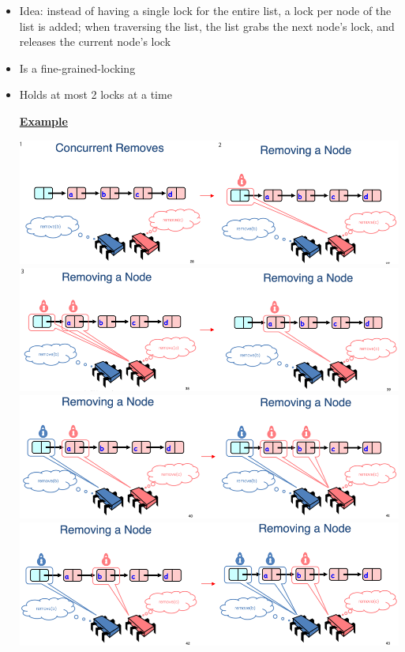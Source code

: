 \documentclass[12pt]{article}
\begin{document}
\begin{itemize}
    \item Idea: instead of having a single lock for the entire list, a lock per node
    of the list is added; when traversing the list, the list grabs the next node's lock,
    and releases the current node's lock
    \item Is a fine-grained-locking
    \item Holds at most 2 locks at a time

    \bigskip

    \underline{\textbf{Example}}

    \bigskip

    \begin{center}
    \includegraphics[width=\linewidth]{../images/midterm_3_solution_3.png}
    \includegraphics[width=\linewidth]{../images/midterm_3_solution_4.png}
    \includegraphics[width=\linewidth]{../images/midterm_3_solution_5.png}
    \includegraphics[width=\linewidth]{../images/midterm_3_solution_6.png}

\end{center}
\end{itemize}
\end{document}
